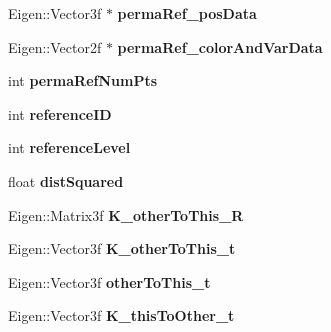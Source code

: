 \begin{DoxyCompactItemize}
\item 
\hypertarget{classlsd__slam_1_1_frame_a18011d25126f677273f88ba227e32278}{Eigen\-::\-Vector3f $\ast$ {\bfseries perma\-Ref\-\_\-pos\-Data}}\label{classlsd__slam_1_1_frame_a18011d25126f677273f88ba227e32278}

\item 
\hypertarget{classlsd__slam_1_1_frame_ab604a46aff3018462fe4171fc9cbde69}{Eigen\-::\-Vector2f $\ast$ {\bfseries perma\-Ref\-\_\-color\-And\-Var\-Data}}\label{classlsd__slam_1_1_frame_ab604a46aff3018462fe4171fc9cbde69}

\item 
\hypertarget{classlsd__slam_1_1_frame_ae2968ee29976f194c3c8c552f7ebf3b7}{int {\bfseries perma\-Ref\-Num\-Pts}}\label{classlsd__slam_1_1_frame_ae2968ee29976f194c3c8c552f7ebf3b7}

\item 
\hypertarget{classlsd__slam_1_1_frame_a45c1d420e51ecd4b078bb5992ef9c72f}{int {\bfseries reference\-I\-D}}\label{classlsd__slam_1_1_frame_a45c1d420e51ecd4b078bb5992ef9c72f}

\item 
\hypertarget{classlsd__slam_1_1_frame_a98746a5422a8afa51dfc5fc21d4e4cc6}{int {\bfseries reference\-Level}}\label{classlsd__slam_1_1_frame_a98746a5422a8afa51dfc5fc21d4e4cc6}

\item 
\hypertarget{classlsd__slam_1_1_frame_a400b62f479205f178a23cd48f41186d0}{float {\bfseries dist\-Squared}}\label{classlsd__slam_1_1_frame_a400b62f479205f178a23cd48f41186d0}

\item 
\hypertarget{classlsd__slam_1_1_frame_aa5422a17806f94238eb4b0a997f84d3c}{Eigen\-::\-Matrix3f {\bfseries K\-\_\-other\-To\-This\-\_\-\-R}}\label{classlsd__slam_1_1_frame_aa5422a17806f94238eb4b0a997f84d3c}

\item 
\hypertarget{classlsd__slam_1_1_frame_a299bcddaca0539b927cc0e3a6ec5739b}{Eigen\-::\-Vector3f {\bfseries K\-\_\-other\-To\-This\-\_\-t}}\label{classlsd__slam_1_1_frame_a299bcddaca0539b927cc0e3a6ec5739b}

\item 
\hypertarget{classlsd__slam_1_1_frame_ac60ac357b2988ee6ae78cc0ea9030d77}{Eigen\-::\-Vector3f {\bfseries other\-To\-This\-\_\-t}}\label{classlsd__slam_1_1_frame_ac60ac357b2988ee6ae78cc0ea9030d77}

\item 
\hypertarget{classlsd__slam_1_1_frame_ae67bd56784580e5bba78c78c54c79513}{Eigen\-::\-Vector3f {\bfseries K\-\_\-this\-To\-Other\-\_\-t}}\label{classlsd__slam_1_1_frame_ae67bd56784580e5bba78c78c54c79513}


\end{DoxyCompactItemize}
